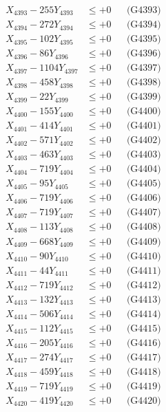 \documentclass[a4paper,10pt]{article}
\begin{document}
{\begin{align}
X_{4393} - 255Y_{4393} &\leq +0 && \text{(G4393)} \\
X_{4394} - 272Y_{4394} &\leq +0 && \text{(G4394)} \\
X_{4395} - 102Y_{4395} &\leq +0 && \text{(G4395)} \\
X_{4396} - 86Y_{4396} &\leq +0 && \text{(G4396)} \\
X_{4397} - 1104Y_{4397} &\leq +0 && \text{(G4397)} \\
X_{4398} - 458Y_{4398} &\leq +0 && \text{(G4398)} \\
X_{4399} - 22Y_{4399} &\leq +0 && \text{(G4399)} \\
X_{4400} - 155Y_{4400} &\leq +0 && \text{(G4400)} \\
\allowbreak
X_{4401} - 414Y_{4401} &\leq +0 && \text{(G4401)} \\
X_{4402} - 571Y_{4402} &\leq +0 && \text{(G4402)} \\
X_{4403} - 463Y_{4403} &\leq +0 && \text{(G4403)} \\
X_{4404} - 719Y_{4404} &\leq +0 && \text{(G4404)} \\
X_{4405} - 95Y_{4405} &\leq +0 && \text{(G4405)} \\
X_{4406} - 719Y_{4406} &\leq +0 && \text{(G4406)} \\
X_{4407} - 719Y_{4407} &\leq +0 && \text{(G4407)} \\
X_{4408} - 113Y_{4408} &\leq +0 && \text{(G4408)} \\
X_{4409} - 668Y_{4409} &\leq +0 && \text{(G4409)} \\
X_{4410} - 90Y_{4410} &\leq +0 && \text{(G4410)} \\
\allowbreak
X_{4411} - 44Y_{4411} &\leq +0 && \text{(G4411)} \\
X_{4412} - 719Y_{4412} &\leq +0 && \text{(G4412)} \\
X_{4413} - 132Y_{4413} &\leq +0 && \text{(G4413)} \\
X_{4414} - 506Y_{4414} &\leq +0 && \text{(G4414)} \\
X_{4415} - 112Y_{4415} &\leq +0 && \text{(G4415)} \\
X_{4416} - 205Y_{4416} &\leq +0 && \text{(G4416)} \\
X_{4417} - 274Y_{4417} &\leq +0 && \text{(G4417)} \\
X_{4418} - 459Y_{4418} &\leq +0 && \text{(G4418)} \\
X_{4419} - 719Y_{4419} &\leq +0 && \text{(G4419)} \\
X_{4420} - 419Y_{4420} &\leq +0 && \text{(G4420)} \\

\end{align}}
\end{document}
